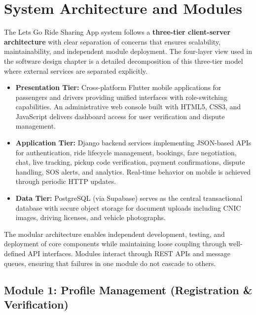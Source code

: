 
\section{System Architecture and Modules}

The Lets Go Ride Sharing App system follows a \textbf{three-tier client-server architecture} with clear separation of concerns that ensures scalability, maintainability, and independent module deployment. The four-layer view used in the software design chapter is a detailed decomposition of this three-tier model where external services are separated explicitly.

\begin{itemize}
    \item \textbf{Presentation Tier:} Cross-platform Flutter mobile applications for passengers and drivers providing unified interfaces with role-switching capabilities. An administrative web console built with HTML5, CSS3, and JavaScript delivers dashboard access for user verification and dispute management.
    
    \item \textbf{Application Tier:} Django backend services implementing JSON-based APIs for authentication, ride lifecycle management, bookings, fare negotiation, chat, live tracking, pickup code verification, payment confirmations, dispute handling, SOS alerts, and analytics. Real-time behavior on mobile is achieved through periodic HTTP updates.
    
    \item \textbf{Data Tier:} PostgreSQL (via Supabase) serves as the central transactional database with secure object storage for document uploads including CNIC images, driving licenses, and vehicle photographs.
\end{itemize}

The modular architecture enables independent development, testing, and deployment of core components while maintaining loose coupling through well-defined API interfaces. Modules interact through REST APIs and message queues, ensuring that failures in one module do not cascade to others.


\subsection{Module 1: Profile Management (Registration \& Verification)}

